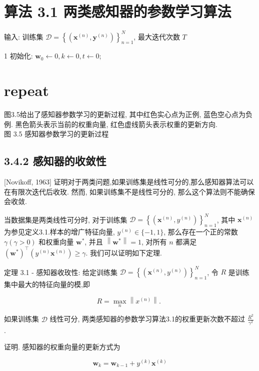 \documentclass[10pt]{article}
\begin{document}
\section*{算法 3.1 两类感知器的参数学习算法}
输入: 训练集 $\mathcal{D}=\left\{\left(\boldsymbol{x}^{(n)}, \boldsymbol{y}^{(n)}\right)\right\}_{n=1}^{N}$, 最大迭代次数 $T$

1 初始化: $\boldsymbol{w}_{0} \leftarrow 0, k \leftarrow 0, t \leftarrow 0$;

\section*{repeat}


图3.5给出了感知器参数学习的更新过程, 其中红色实心点为正例, 蓝色空心点为负例. 黑色箭头表示当前的权重向量, 红色虚线箭头表示权重的更新方向.\\


图 3.5 感知器参数学习的更新过程

\subsection*{3.4.2 感知器的收敛性}
[Novikoff, 1963] 证明对于两类问题,如果训练集是线性可分的,那么感知器算法可以在有限次迭代后收玫. 然而, 如果训练集不是线性可分的, 那么这个算法则不能确保会收敛.

当数据集是两类线性可分时, 对于训练集 $\mathcal{D}=\left\{\left(\boldsymbol{x}^{(n)}, y^{(n)}\right)\right\}_{n=1}^{N}$, 其中 $\boldsymbol{x}^{(n)}$ 为参见定义3.1.样本的增广特征向量, $y^{(n)} \in\{-1,1\}$, 那么存在一个正的常数 $\gamma(\gamma>0)$ 和权重向量 $\boldsymbol{w}^{*}$, 并且 $\left\|\boldsymbol{w}^{*}\right\|=1$, 对所有 $n$ 都满足 $\left(\boldsymbol{w}^{*}\right)^{\top}\left(y^{(n)} \boldsymbol{x}^{(n)}\right) \geq \gamma$. 我们可以证明如下定理.

定理 3.1 - 感知器收玫性: 给定训练集 $\mathcal{D}=\left\{\left(\boldsymbol{x}^{(n)}, y^{(n)}\right)\right\}_{n=1}^{N}$, 令 $R$ 是训练集中最大的特征向量的模,即

$$
R=\max _{n}\left\|x^{(n)}\right\| \text {. }
$$

如果训练集 $\mathcal{D}$ 线性可分, 两类感知器的参数学习算法3.1的权重更新次数不超过 $\frac{R^{2}}{\gamma^{2}}$.

证明. 感知器的权重向量的更新方式为


\begin{equation*}
\boldsymbol{w}_{k}=\boldsymbol{w}_{k-1}+y^{(k)} \boldsymbol{x}^{(k)} \tag{3.59}
\end{equation*}
\end{document}
